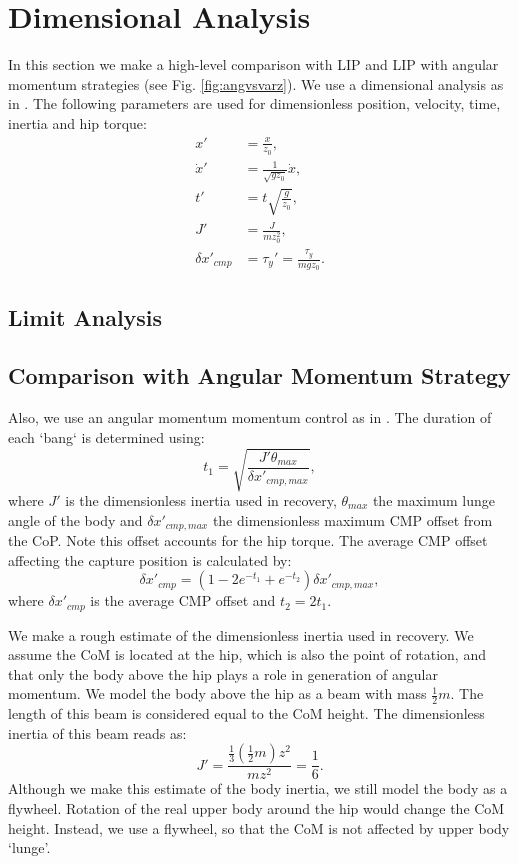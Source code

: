 \documentclass[letterpaper, 10 pt, conference]{ieeeconf}  %
\begin{document}
\section{Dimensional Analysis}\label{sec:comparison}
In this section we make a high-level comparison with LIP and LIP with angular momentum strategies (see Fig. \ref{fig:angvsvarz}). We use a dimensional analysis as in \cite{pratt2006capture,stephens2007humanoid,koolen2012capturability}. The following parameters are used for dimensionless position, velocity, time, inertia and hip torque:
\begin{align}
	x' &= \frac{x}{z_0}, \\
	\dot{x}' &= \frac{1}{\sqrt{gz_0}}\dot{x},\\
	t' &= t\sqrt{\frac{g}{z_0}},\\
	J' &= \frac{J}{mz_0^2},\\
	\delta x'_{cmp} &= \tau_y' = \frac{\tau_y}{mgz_0}.
\end{align}
\subsection{Limit Analysis}

\subsection{Comparison with Angular Momentum Strategy}
Also, we use an angular momentum momentum control as in \cite{pratt2006capture,stephens2007humanoid,koolen2012capturability}. The duration of each `bang` is determined using:
\begin{equation}	
	t_{1} = \sqrt{\frac{J'\theta_{max}}{\delta x'_{cmp,max}}},
\end{equation}
where $J'$ is the dimensionless inertia used in recovery, $\theta_{max}$ the maximum lunge angle of the body and $\delta x'_{cmp,max}$ the dimensionless maximum CMP offset from the CoP. Note this offset accounts for the hip torque. The average CMP offset affecting the capture position is calculated by:
\begin{equation}
 \delta x'_{cmp} = (1 -2e^{-t_1}+e^{-t_2})\delta x'_{cmp,max},
\end{equation}
where $\delta x'_{cmp}$ is the average CMP offset and $t_2=2t_1$.

We make a rough estimate of the dimensionless inertia used in recovery. We assume the CoM is located at the hip, which is also the point of rotation, and that only the body above the hip plays a role in generation of angular momentum. We model the body above the hip as a beam with mass $\frac{1}{2}m$. The length of this beam is considered equal to the CoM height. The dimensionless inertia of this beam reads as:
\begin{equation}
	J' = \frac{\frac{1}{3}(\frac{1}{2}m)z^2}{mz^2} = \frac{1}{6}.
\end{equation}
Although we make this estimate of the body inertia, we still model the body as a flywheel. Rotation of the real upper body around the hip would change the CoM height. Instead, we use a flywheel, so that the CoM is not affected by upper body `lunge'.
\end{document}
